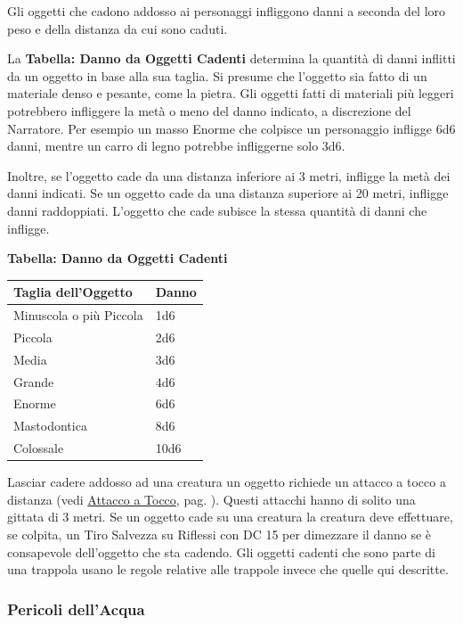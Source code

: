 \begin{multicols}{2}
Gli oggetti che cadono addosso ai personaggi infliggono danni a seconda del loro peso e della distanza da cui sono caduti.

La \textbf{Tabella: Danno da Oggetti Cadenti} determina la quantità di danni inflitti da un oggetto in base alla sua taglia. Si presume che l'oggetto sia fatto di un materiale denso e pesante, come la pietra.
Gli oggetti fatti di materiali più leggeri potrebbero infliggere la metà o meno del danno indicato, a discrezione del Narratore. Per esempio un masso Enorme che colpisce un personaggio infligge 6d6 danni, mentre un carro di legno potrebbe infliggerne solo 3d6.

Inoltre, se l'oggetto cade da una distanza inferiore ai 3 metri, infligge la metà dei danni indicati. Se un oggetto cade da una distanza superiore ai 20 metri, infligge danni raddoppiati. L'oggetto che cade subisce la stessa quantità di danni che infligge.

\bigskip

\textbf{Tabella: Danno da Oggetti Cadenti}

\medskip

\noindent\begin{tabularx}{\linewidth}{Xl}
	\toprule
\rowcolor{gray!20}\textbf{Taglia dell'Oggetto} & \textbf{Danno}\\
\toprule
Minuscola o più Piccola & 1d6\\
\rowcolor{gray!20}Piccola & 2d6\\
Media & 3d6\\
\rowcolor{gray!20}Grande & 4d6\\
Enorme & 6d6\\
\rowcolor{gray!20}Mastodontica & 8d6\\
Colossale & 10d6
\end{tabularx}

\bigskip

Lasciar cadere addosso ad una creatura un oggetto richiede un attacco a tocco a distanza (vedi \hyperlink{attaccoatocco}{Attacco a Tocco}, pag. \pageref{attaccoatocco}). Questi attacchi hanno di solito una gittata di 3 metri. Se un oggetto cade su una creatura la creatura deve effettuare, se colpita, un Tiro Salvezza su Riflessi con DC 15 per dimezzare il danno se è consapevole dell'oggetto che sta cadendo. Gli oggetti cadenti che sono parte di una trappola usano le regole relative alle trappole invece che quelle qui descritte.

\subsubsection{Pericoli dell'Acqua}\hypertarget{pericoli-dellacqua}{}\label{pericoli-dellacqua} 


\end{multicols}
